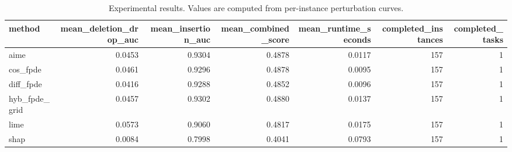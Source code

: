 \begin{table}[t]
\caption{Experimental results. Values are computed from per-instance perturbation curves.}
\label{tab:main_results_computed}
\centering
\begin{tabular}{lrrrrrr}
\toprule
method & mean\_deletion\_drop\_auc & mean\_insertion\_auc & mean\_combined\_score & mean\_runtime\_seconds & completed\_instances & completed\_tasks \\
\midrule
aime & 0.0453 & 0.9304 & 0.4878 & 0.0117 & 157 & 1 \\
cos\_fpde & 0.0461 & 0.9296 & 0.4878 & 0.0095 & 157 & 1 \\
diff\_fpde & 0.0416 & 0.9288 & 0.4852 & 0.0096 & 157 & 1 \\
hyb\_fpde\_grid & 0.0457 & 0.9302 & 0.4880 & 0.0137 & 157 & 1 \\
lime & 0.0573 & 0.9060 & 0.4817 & 0.0175 & 157 & 1 \\
shap & 0.0084 & 0.7998 & 0.4041 & 0.0793 & 157 & 1 \\
\bottomrule
\end{tabular}

\end{table}
